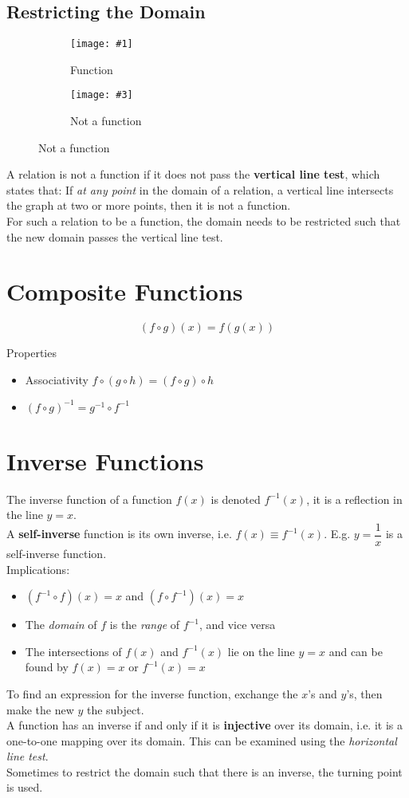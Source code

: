\documentclass[11pt]{article}
\newcommand{\lb}{\\[8pt]}
\newcommand{\doubleimg}[4]{\begin{center}
  \begin{figure}[H]
    \centering
    \begin{subfigure}{.45\textwidth}
      \centering
      \texttt{[image: \#1]}
      \caption{#2}
      \label{fig:sub1}
    \end{subfigure}
    \begin{subfigure}{.45\textwidth}
      \centering
      \texttt{[image: \#3]}
      \caption{#4}
      \label{fig:sub2}
    \end{subfigure}
  \end{figure}
\end{center}}
\begin{document}
\pagebreak

\subsection{Restricting the Domain}

\doubleimg{figs/isfn.png}{Function}{figs/nofn.png}{Not a function}

\noindent A relation is not a function if it does not pass the \textbf{vertical line test}, which states that: If \textit{at any point} in the domain of a relation, a vertical line intersects the graph at two or more points, then it is not a function.\lb
For such a relation to be a function, the domain needs to be restricted such that the new domain passes the vertical line test.

\pagebreak

\section{Composite Functions}

$$(f \circ g)(x) = f(g(x))$$

Properties
\begin{itemize}
  \item Associativity $f\circ (g\circ h) = (f\circ g)\circ h$
  \item $(f\circ g)^{-1} = g^{-1} \circ f^{-1}$
\end{itemize}

\section{Inverse Functions}
The inverse function of a function $f(x)$ is denoted $f^{-1}(x)$, it is a reflection in the line $y = x$.\lb
A \textbf{self-inverse} function is its own inverse, i.e. $f(x) \equiv f^{-1}(x)$. E.g. $y = \dfrac{1}{x}$ is a self-inverse function.\lb
Implications:
\begin{itemize}
  \item $(f^{-1} \circ f)(x) = x$ and $(f \circ f^{-1})(x) = x$
  \item The \textit{domain} of $f$ is the \textit{range} of $f^{-1}$, and vice versa
  \item The intersections of $f(x)$ and $f^{-1}(x)$ lie on the line $y = x$ and can be found by $f(x) = x$ or $f^{-1}(x) = x$
\end{itemize}
To find an expression for the inverse function, exchange the $x$'s and $y$'s, then make the new $y$ the subject.\lb
A function has an inverse if and only if it is \textbf{injective} over its domain, i.e. it is a one-to-one mapping over its domain. This can be examined using the \textit{horizontal line test}. \lb
Sometimes to restrict the domain such that there is an inverse, the turning point is used.
\end{document}
